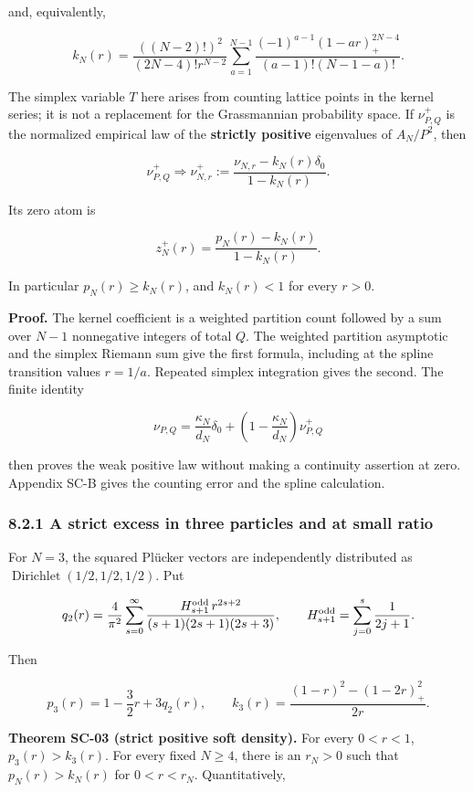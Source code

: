 and, equivalently,

\[
k_N(r)=\frac{((N-2)!)^2}{(2N-4)!r^{N-2}}
\sum_{a=1}^{N-1}
\frac{(-1)^{a-1}(1-ar)_+^{2N-4}}{(a-1)!(N-1-a)!}.
\]

The simplex variable \(T\) here arises from counting lattice points in the kernel series; it is not a replacement for the Grassmannian probability space. If \(\nu^+_{P,Q}\) is the normalized empirical law of the \textbf{strictly positive} eigenvalues of \(A_N/P^2\), then

\[
\nu^+_{P,Q}\Longrightarrow
\nu^+_{N,r}:=\frac{\nu_{N,r}-k_N(r)\delta_0}{1-k_N(r)}.
\]

Its zero atom is

\[
z_N^+(r)=\frac{p_N(r)-k_N(r)}{1-k_N(r)}.
\]

In particular \(p_N(r)\geq k_N(r)\), and \(k_N(r)<1\) for every \(r>0\).

\textbf{Proof.} The kernel coefficient is a weighted partition count followed by a sum over \(N-1\) nonnegative integers of total \(Q\). The weighted partition asymptotic and the simplex Riemann sum give the first formula, including at the spline transition values \(r=1/a\). Repeated simplex integration gives the second. The finite identity

\[
\nu_{P,Q}=\frac{\kappa_N}{d_N}\delta_0+
\left(1-\frac{\kappa_N}{d_N}\right)\nu^+_{P,Q}
\]

then proves the weak positive law without making a continuity assertion at zero. Appendix SC-B gives the counting error and the spline calculation.

\hypertarget{a-strict-excess-in-three-particles-and-at-small-ratio}{%
\subsubsection{8.2.1 A strict excess in three particles and at small ratio}\label{a-strict-excess-in-three-particles-and-at-small-ratio}}

For \(N=3\), the squared Plücker vectors are independently distributed as \(\operatorname{Dirichlet}(1/2,1/2,1/2)\). Put

\[
q_2(r)=\frac4{\pi^2}\sum_{s=0}^{\infty}
\frac{H_{s+1}^{\rm odd}\,r^{2s+2}}{(s+1)(2s+1)(2s+3)},\qquad
H_{s+1}^{\rm odd}=\sum_{j=0}^{s}\frac1{2j+1}.
\]

Then

\[
p_3(r)=1-\frac32r+3q_2(r),\qquad
k_3(r)=\frac{(1-r)^2-(1-2r)_+^2}{2r}.
\]

\textbf{Theorem SC-03 (strict positive soft density).} For every \(0<r<1\), \(p_3(r)>k_3(r)\). For every fixed \(N\geq4\), there is an \(r_N>0\) such that \(p_N(r)>k_N(r)\) for \(0<r<r_N\). Quantitatively,

